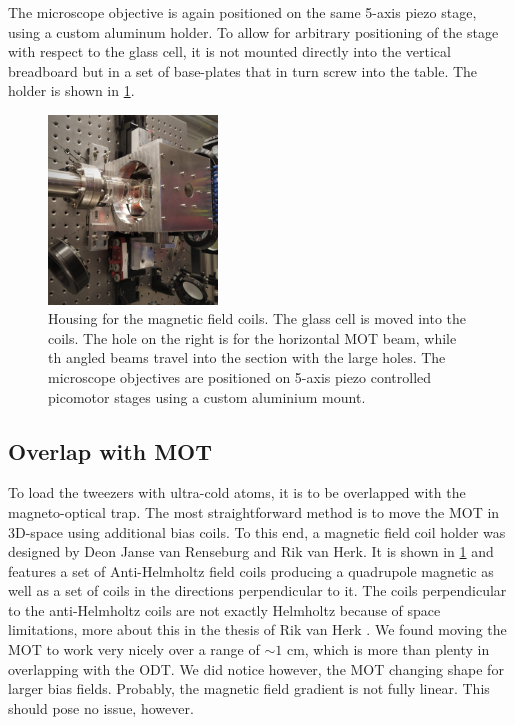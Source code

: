 The microscope objective is again positioned on the same 5-axis piezo stage, using a custom aluminum holder.
To allow for arbitrary positioning of the stage with respect to the glass cell, it is not mounted directly into the vertical breadboard but in a set of base-plates that in turn screw into the table.
The holder is shown in \cref{fig:Coils}.

\begin{figure}
    \centering
    \includegraphics[width=0.4\textwidth]{figures/Coils.jpg}
    \caption{Housing for the magnetic field coils. The glass cell is moved into the coils. 
    The hole on the right is for the horizontal MOT beam, while th angled beams travel into the section with the large holes. The microscope objectives are positioned on 5-axis piezo controlled picomotor stages using a custom aluminium mount.}
    \label{fig:Coils}
\end{figure}

\subsection{Overlap with MOT}\label{subsec:Overlap}

To load the tweezers with ultra-cold atoms, it is to be overlapped with the magneto-optical trap.
The most straightforward method is to move the MOT in 3D-space using additional bias coils.
To this end, a magnetic field coil holder was designed by Deon Janse van Renseburg and Rik van Herk. 
It is shown in \cref{fig:Coils} and features a set of Anti-Helmholtz field coils producing a quadrupole magnetic as well as a set of coils in the directions perpendicular to it.
The coils perpendicular to the anti-Helmholtz coils are not exactly Helmholtz because of space limitations, more about this in the thesis of Rik van Herk \cite{Herk2022}.
We found moving the MOT to work very nicely over a range of $\sim 1$ cm, which is more than plenty in overlapping with the \ac{ODT}.
We did notice however, the MOT changing shape for larger bias fields. 
Probably, the magnetic field gradient is not fully linear.
This should pose no issue, however.


